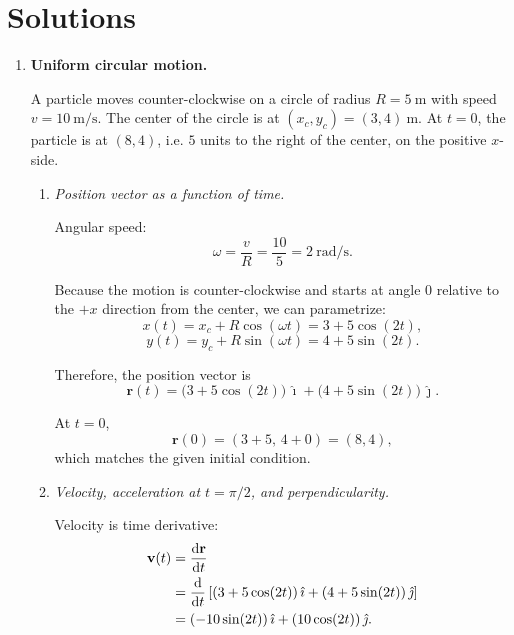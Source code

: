 \documentclass[../main.tex]{subfiles}
\begin{document}
\maketitle

\section*{Solutions}

\begin{enumerate}

\item \textbf{Uniform circular motion.}

A particle moves counter-clockwise on a circle of radius $R = 5~\text{m}$ with speed $v = 10~\text{m/s}$. The center of the circle is at $(x_c, y_c) = (3,4)~\text{m}$. At $t=0$, the particle is at $(8,4)$, i.e. $5$ units to the right of the center, on the positive $x$-side.

\begin{enumerate}
    \item \textit{Position vector as a function of time.}

    Angular speed:
    \[
    \omega = \frac{v}{R} = \frac{10}{5} = 2~\text{rad/s}.
    \]

    Because the motion is counter-clockwise and starts at angle $0$ relative to the $+x$ direction from the center, we can parametrize:
    \[
    x(t) = x_c + R \cos(\omega t) = 3 + 5\cos(2t),
    \]
    \[
    y(t) = y_c + R \sin(\omega t) = 4 + 5\sin(2t).
    \]

    Therefore, the position vector is
    \[
    \mathbf{r}(t)
    = \big(3 + 5\cos(2t)\big)\,\hat{\imath}
    + \big(4 + 5\sin(2t)\big)\,\hat{\jmath}.
    \]

    At $t=0$,
    \[
    \mathbf{r}(0)
    = (3+5,\,4+0)
    = (8,4),
    \]
    which matches the given initial condition.

    \item \textit{Velocity, acceleration at $t=\pi/2$, and perpendicularity.}

    Velocity is time derivative:
    \begin{align*}
    \mathbf{v}(t)
    &= \dv{\mathbf{r}}{t} \\
    &= \dv{t}\left[(3 + 5\cos(2t))\,\hat{\imath}
    + (4 + 5\sin(2t))\,\hat{\jmath}\right] \\
    &= (-10\sin(2t))\,\hat{\imath}
    + (10\cos(2t))\,\hat{\jmath}.
    \end{align*}


\end{enumerate}
\end{enumerate}
\end{document}
